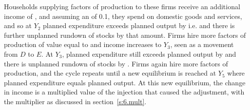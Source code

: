 \documentclass[Economics.tex]{subfiles}
\begin{document}
Households supplying factors of production to these firms receive an additional income of , and assuming an  of \num{0.1}, they spend  on domestic goods and services, and so at \(Y_2\) planned expenditure exceeds planned output by  i.e.  and there is further unplanned rundown of stocks by that amount. Firms hire more factors of production of value equal to  and income increases to \(Y_3\), seen as a movement from \(D\) to \(E\). At \(Y_3\), planned expenditure still exceeds planned output by  and there is unplanned rundown of stocks by . Firms again hire more factors of production, and the cycle repeats until a new equilibrium is reached at \(Y_5\) where planned expenditure equals planned output. At this new equilibrium, the change in income is a multiplied value of the injection that caused the adjustment, with the multiplier as discussed in section~\ref{s:6.mult}.
\end{document}
